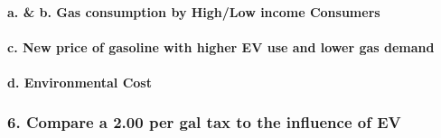 \documentclass[]{article}
\let\oldparagraph\paragraph
\renewcommand{\paragraph}[1]{\oldparagraph{#1}\mbox{}}
\begin{document}
\paragraph{a. \& b. Gas consumption by High/Low income
Consumers}\label{a.-b.-gas-consumption-by-highlow-income-consumers}

\paragraph{c. New price of gasoline with higher EV use and lower gas
demand}\label{c.-new-price-of-gasoline-with-higher-ev-use-and-lower-gas-demand}

\paragraph{d. Environmental Cost}\label{d.-environmental-cost}

\subsubsection{6. Compare a 2.00 per gal tax to the influence of
EV}\label{compare-a-2.00-per-gal-tax-to-the-influence-of-ev}
\end{document}
